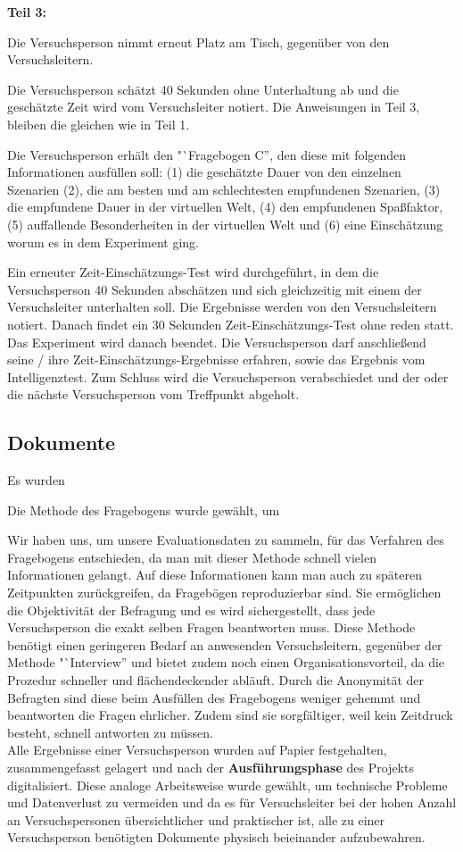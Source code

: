 \documentclass{Bericht}
\begin{document}
\textbf{Teil 3:}

Die Versuchsperson nimmt erneut Platz am Tisch, gegenüber von den Versuchsleitern. 

Die Versuchsperson schätzt 40 Sekunden ohne Unterhaltung ab und die geschätzte Zeit wird vom Versuchsleiter notiert. Die Anweisungen in Teil 3, bleiben die gleichen wie in Teil 1.

Die Versuchsperson erhält den "`Fragebogen C'', den diese mit folgenden Informationen ausfüllen soll:  (1) die geschätzte Dauer von den einzelnen Szenarien (2), die am besten und am schlechtesten empfundenen Szenarien, (3) die empfundene Dauer in der virtuellen Welt, (4) den empfundenen Spaßfaktor, (5) auffallende Besonderheiten in der virtuellen Welt und (6) eine Einschätzung worum es in dem Experiment ging.

Ein erneuter Zeit-Einschätzungs-Test wird durchgeführt, in dem die Versuchsperson 40 Sekunden abschätzen und sich gleichzeitig mit einem der Versuchsleiter unterhalten soll. Die Ergebnisse werden von den Versuchsleitern notiert. Danach findet ein 30 Sekunden Zeit-Einschätzungs-Test ohne reden statt. Das Experiment wird danach beendet. Die Versuchsperson darf anschließend seine / ihre Zeit-Einschätzungs-Ergebnisse erfahren, sowie das Ergebnis vom Intelligenztest. Zum Schluss wird die Versuchsperson verabschiedet und der oder die nächste Versuchsperson vom Treffpunkt abgeholt.

\subsection{Dokumente}

Es wurden 


Die Methode des Fragebogens wurde gewählt, um 

Wir haben uns, um unsere Evaluationsdaten zu sammeln, für das Verfahren des Fragebogens entschieden, da man mit dieser Methode schnell vielen Informationen gelangt. Auf diese Informationen kann man auch zu späteren Zeitpunkten zurückgreifen, da Fragebögen reproduzierbar sind. Sie ermöglichen die Objektivität der Befragung und es wird sichergestellt, dass jede Versuchsperson die exakt selben Fragen beantworten muss. Diese Methode benötigt einen geringeren Bedarf an anwesenden Versuchsleitern, gegenüber der Methode "`Interview'' und bietet zudem noch einen Organisationsvorteil, da die Prozedur schneller und flächendeckender abläuft. Durch die Anonymität der Befragten sind diese beim Ausfüllen des Fragebogens weniger gehemmt und beantworten die Fragen ehrlicher. Zudem sind sie sorgfältiger, weil kein Zeitdruck besteht, schnell antworten zu müssen.\\
Alle Ergebnisse einer Versuchsperson wurden auf Papier festgehalten, zusammengefasst gelagert und nach der \textbf{Ausführungsphase} des Projekts digitalisiert. Diese analoge Arbeitsweise wurde gewählt, um technische Probleme und Datenverlust zu vermeiden und da es für Versuchsleiter bei der hohen Anzahl an Versuchspersonen übersichtlicher und praktischer ist, alle zu einer Versuchsperson benötigten Dokumente physisch beieinander aufzubewahren.
\end{document}
